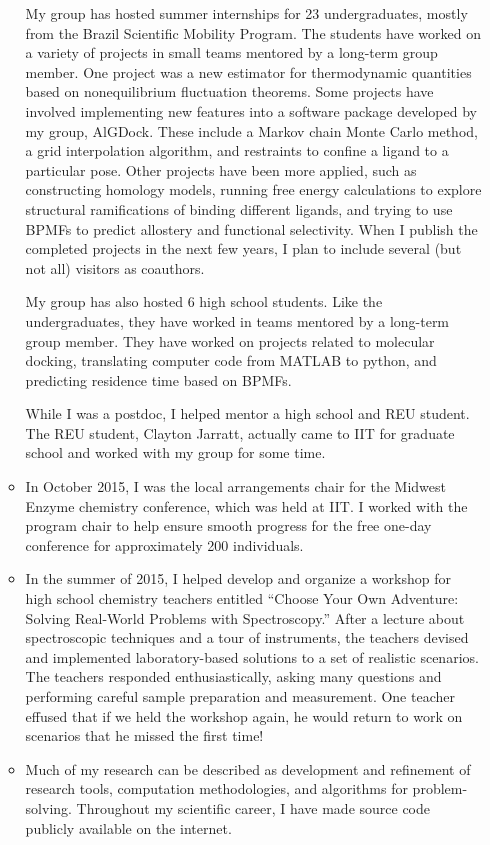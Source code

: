 \begin{enumerate}[(a)]
\begin{itemize}
My group has hosted summer internships for 23 undergraduates, 
mostly from the Brazil Scientific Mobility Program.
The students have worked on a variety of projects in small teams mentored by a long-term group member.
One project was a new estimator for thermodynamic quantities based on nonequilibrium fluctuation theorems.
Some projects have involved implementing new features into a software package developed by my group, AlGDock.
These include a Markov chain Monte Carlo method, 
a grid interpolation algorithm, 
and restraints to confine a ligand to a particular pose.
Other projects have been more applied, such as 
constructing homology models, 
running free energy calculations to explore structural ramifications of binding different ligands,
and trying to use BPMFs to predict allostery and functional selectivity.
When I publish the completed projects in the next few years, I plan to include several (but not all) visitors as coauthors.

My group has also hosted 6 high school students.
Like the undergraduates, they have worked in teams mentored by a long-term group member.
They have worked on projects related to molecular docking, 
translating computer code from MATLAB to python,
and predicting residence time based on BPMFs.

While I was a postdoc, I helped mentor a high school and REU student.
The REU student, Clayton Jarratt, actually came to IIT for graduate school and worked with my group for some time.

\item In October 2015, I was the local arrangements chair for the Midwest Enzyme chemistry conference, which was held at IIT. I worked with the program chair to help ensure smooth progress for the free one-day conference for approximately 200 individuals.

\item In the summer of 2015, I helped develop and organize a workshop for high school chemistry teachers entitled 
``Choose Your Own Adventure: Solving Real-World Problems with Spectroscopy.''
After a lecture about spectroscopic techniques and a tour of instruments, 
the teachers devised and implemented laboratory-based solutions to a set of realistic scenarios.
The teachers responded enthusiastically, asking many questions 
and performing careful sample preparation and measurement.
One teacher effused that if we held the workshop again, 
he would return to work on scenarios that he missed the first time!

\item Much of my research can be described as development and refinement of research tools, computation methodologies, and algorithms for problem-solving. Throughout my scientific career, I have made source code publicly available on the internet.


\end{itemize}
\end{enumerate}
